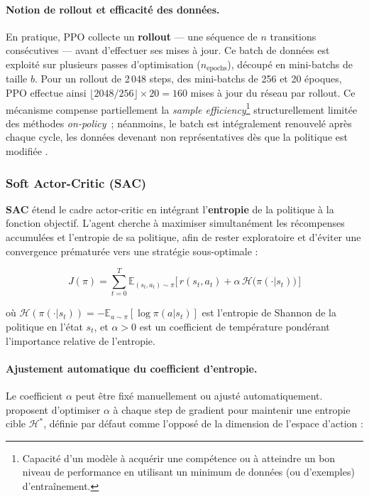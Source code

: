 \paragraph{Notion de rollout et efficacité des données.}
\label{sec:rollout}
En pratique, PPO collecte un \textbf{rollout} --- une séquence de
$n$ transitions consécutives --- avant d'effectuer ses mises
à jour. Ce batch de données est exploité sur plusieurs passes d'optimisation
($n_\text{epochs}$), découpé en mini-batchs de taille $b$.
Pour un rollout de 2\,048 steps, des mini-batchs de 256 et 20 époques, PPO
effectue ainsi $\lfloor 2048/256 \rfloor \times 20 = 160$ mises à jour du
réseau par rollout. Ce mécanisme compense partiellement la
\textit{sample efficiency}\footnote{Capacité d'un modèle à acquérir une compétence ou à atteindre un bon niveau de performance en utilisant un minimum de données (ou d'exemples) d'entraînement.} structurellement limitée des méthodes
\textit{on-policy}~; néanmoins, le batch est intégralement renouvelé après chaque cycle, les données devenant non représentatives dès que la politique est modifiée \parencite{schulmanProximalPolicyOptimization2017}.
 
\subsubsection{Soft Actor-Critic (SAC)}
\label{sec:sac}
 
\textbf{SAC} \parencite{haarnojaSoftActorCriticOffPolicy2018} étend le cadre
actor-critic en intégrant l'\textbf{entropie} de la politique à la fonction
objectif. L'agent cherche à maximiser simultanément les récompenses
accumulées et l'entropie de sa politique, afin de rester
exploratoire et d'éviter une convergence prématurée vers une stratégie
sous-optimale :
 
\begin{equation}
    J(\pi) = \sum_{t=0}^{T} \mathbb{E}_{(s_t,a_t)\sim\pi}
    \Big[\,r(s_t, a_t) + \alpha\,\mathcal{H}\!\big(\pi(\cdot|s_t)\big)\,\Big]
\end{equation}
 
\noindent où $\mathcal{H}(\pi(\cdot|s_t)) = -\mathbb{E}_{a\sim\pi}[\log\pi(a|s_t)]$
est l'entropie de Shannon de la politique en l'état $s_t$, et $\alpha > 0$
est un coefficient de température pondérant l'importance relative de l'entropie.
 
\paragraph{Ajustement automatique du coefficient d'entropie.}
Le coefficient $\alpha$ peut être fixé manuellement ou ajusté automatiquement.
\textcite{haarnojaSoftActorCriticAlgorithms2019} proposent d'optimiser
$\alpha$ à chaque step de gradient pour maintenir une entropie cible
$\mathcal{H}^*$, définie par défaut comme l'opposé de la dimension de
l'espace d'action :
 
